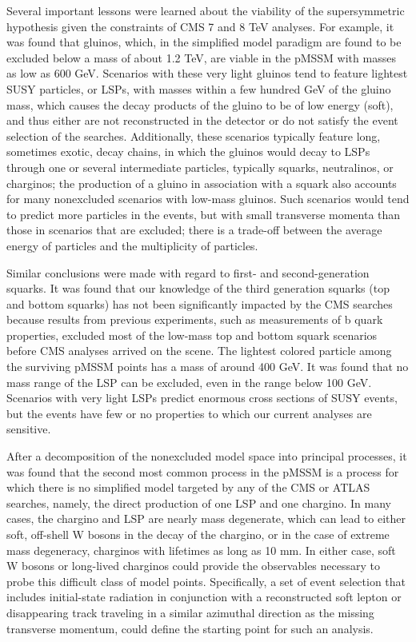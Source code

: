 Several important lessons were learned about the viability of the supersymmetric hypothesis given the constraints of CMS 7 and 8 TeV analyses. For example, it was found that gluinos, which, in the simplified model paradigm are found to be excluded below a mass of about 1.2 TeV, are viable in the pMSSM with masses as low as 600 GeV. Scenarios with these very light gluinos tend to feature lightest SUSY particles, or LSPs, with masses within a few hundred GeV of the gluino mass, which causes the decay products of the gluino to be of low energy (soft), and thus either are not reconstructed in the detector or do not satisfy the event selection of the searches. Additionally, these scenarios typically feature long, sometimes exotic, decay chains, in which the gluinos would decay to LSPs through one or several intermediate particles, typically squarks, neutralinos, or charginos; the production of a gluino in association with a squark also accounts for many nonexcluded scenarios with low-mass gluinos. Such scenarios would tend to predict more particles in the events, but with small transverse momenta than those in scenarios that are excluded; there is a trade-off between the average energy of particles and the multiplicity of particles.

Similar conclusions were made with regard to first- and second-generation squarks. It was found that our knowledge of the third generation squarks (top and bottom squarks) has not been significantly impacted by the CMS searches because  results from previous experiments, such as measurements of b quark properties, excluded most of the low-mass top and bottom squark scenarios before CMS analyses arrived on the scene. The lightest colored particle among the surviving pMSSM points has a mass of around 400 GeV. It was found that no mass range of the LSP can be excluded, even in the range below 100 GeV. Scenarios with very light LSPs predict enormous cross sections of SUSY events, but the events have few or no properties to which our current analyses are sensitive. 

After a decomposition of the nonexcluded model space into principal processes, it was found that the second most common process in the pMSSM is a process for which there is no simplified model targeted by any of the CMS or ATLAS searches, namely, the direct production of one LSP and one chargino. In many cases, the chargino and LSP are nearly mass degenerate, which can lead to either soft, off-shell W bosons in the decay of the chargino, or in the case of extreme mass degeneracy, charginos with lifetimes as long as 10 mm. In either case, soft W bosons or long-lived charginos could provide the observables necessary to probe this difficult class of model points. Specifically, a set of event selection that includes initial-state radiation in conjunction with a reconstructed soft lepton or disappearing track traveling in a similar azimuthal direction as the missing transverse momentum, could define the starting point for such an analysis. 

